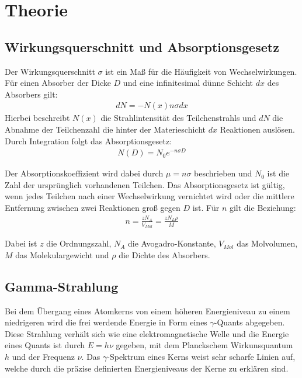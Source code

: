 \section{Theorie}
\label{sec:Theorie}


\subsection{Wirkungsquerschnitt und Absorptionsgesetz}
Der Wirkungsquerschnitt $\sigma$ ist ein Maß für die Häufigkeit von Wechselwirkungen. Für einen Absorber der Dicke $D$ und eine infinitesimal dünne Schicht $dx$ des
Absorbers gilt:
\begin{align}
  dN = -N(x)n \sigma dx
\end{align}
Hierbei beschreibt $N(x)$ die Strahlintensität des Teilchenstrahls und $dN$ die Abnahme der Teilchenzahl
die hinter der Materieschicht $dx$ Reaktionen auslösen. Durch Integration folgt das Absorptionsgesetz:
\begin{align}
  N(D) = N_0 e^{-n  \sigma D}
\end{align}

Der Absorptionskoeffizient wird dabei durch $\mu = n \sigma$ beschrieben und $N_0$ ist die Zahl der ursprünglich
vorhandenen Teilchen. Das Absorptionsgesetz ist gültig, wenn jedes Teilchen nach einer Wechselwirkung vernichtet wird oder
die mittlere Entfernung zwischen zwei Reaktionen groß gegen $D$ ist. Für $n$ gilt die Beziehung:
\begin{align}
  n = \frac{z N_A}{V_{Mol}} = \frac{z N_L \rho}{M}
\end{align}

Dabei ist $z$ die Ordnungszahl, $N_A$ die Avogadro-Konstante, $V_{Mol}$ das Molvolumen, $M$ das Molekulargewicht
und $\rho$ die Dichte des Absorbers.


\subsection{Gamma-Strahlung}

Bei dem Übergang eines Atomkerns von einem höheren Energieniveau zu einem niedrigeren wird die
frei werdende Energie in Form eines $\gamma$-Quants abgegeben. Diese Strahlung verhält sich wie eine elektromagnetische Welle und
die Energie eines Quants ist durch $E = h \nu$ gegeben, mit dem Planckschem Wirkunsquantum $h$ und der Frequenz $\nu$.
Das $\gamma$-Spektrum  eines Kerns weist sehr scharfe Linien auf, welche durch die präzise definierten Energieniveaus der Kerne
zu erklären sind.

